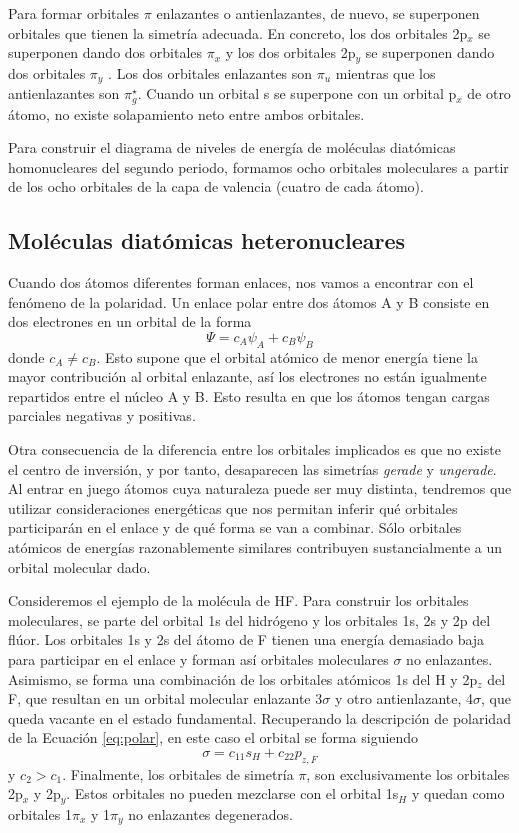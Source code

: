 Para formar orbitales $\pi$ enlazantes o antienlazantes, 
de nuevo, se superponen orbitales que tienen la simetría
adecuada. En concreto, los dos orbitales 2p$_x$ se 
superponen dando dos orbitales $\pi_x$ y los dos orbitales 
2p$_y$ se superponen dando dos orbitales $\pi_y$ . Los dos
orbitales enlazantes son $\pi_u$ mientras que los
antienlazantes son $\pi_g^\star$.
Cuando un orbital s se superpone con un orbital p$_x$ de otro átomo, no existe solapamiento neto entre ambos orbitales.

Para construir el diagrama de niveles de energía de moléculas diatómicas homonucleares del segundo periodo, formamos ocho 
orbitales moleculares a partir de los ocho orbitales de la 
capa de valencia (cuatro de cada átomo).

\subsection{Moléculas diatómicas heteronucleares}
Cuando dos átomos diferentes forman enlaces, nos vamos
a encontrar con el fenómeno de la polaridad. 
Un enlace polar entre dos átomos A y B consiste en dos 
electrones en un orbital de la forma
\begin{equation}
    \Psi=c_A\psi_A + c_B\psi_B\label{eq:polar}
\end{equation}
donde $c_A\neq c_B$. Esto supone que el orbital atómico
de menor energía tiene la mayor contribución al orbital 
enlazante, así los electrones no están igualmente repartidos
entre el núcleo A y B. Esto resulta en que los átomos 
tengan cargas parciales negativas y positivas.

Otra consecuencia de la diferencia entre los orbitales 
implicados es que no existe el centro de inversión, y 
por tanto, desaparecen las simetrías \textit{gerade} y 
\textit{ungerade}. Al entrar en juego átomos 
cuya naturaleza puede ser muy distinta, tendremos que 
utilizar consideraciones energéticas que nos permitan 
inferir qué orbitales participarán en el enlace y de qué 
forma se van a combinar. Sólo orbitales atómicos de 
energías razonablemente similares contribuyen sustancialmente
a un orbital molecular dado.

Consideremos el ejemplo de la molécula de HF. Para construir 
los orbitales moleculares, se parte del orbital 1s del hidrógeno
y los orbitales 1s, 2s y 2p del flúor. Los orbitales 1s y 2s
del átomo de F tienen una energía demasiado baja para participar
en el enlace y forman así orbitales moleculares $\sigma$
no enlazantes. Asimismo, se forma una combinación de los 
orbitales atómicos 1s del H y 2p$_z$ del F, que resultan en
un orbital molecular enlazante 3$\sigma$ y otro antienlazante, 
4$\sigma$, que queda vacante en el estado fundamental. 
Recuperando la descripción de polaridad de la Ecuación
\ref{eq:polar}, en este caso el orbital se forma siguiendo
\begin{equation}
    \sigma=c_11s_H + c_22p_{z,F}
\end{equation}
y $c_2>c_1$. Finalmente, los orbitales de simetría $\pi$, 
son exclusivamente los orbitales 2p$_x$ y 2p$_y$. Estos 
orbitales no pueden mezclarse con el orbital 1s$_H$ y
quedan como orbitales 1$\pi_x$ y 1$\pi_y$ no enlazantes degenerados. 


